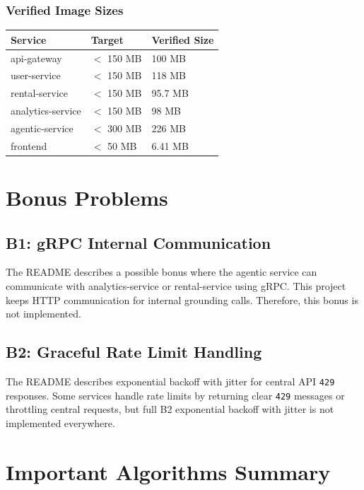 \documentclass[11pt,a4paper]{article}
\begin{document}
\subsubsection*{Verified Image Sizes}

\begin{center}
\begin{tabular}{|p{5cm}|p{3cm}|p{3cm}|}
\hline
\textbf{Service} & \textbf{Target} & \textbf{Verified Size} \\
\hline
api-gateway & $<$ 150 MB & 100 MB \\
\hline
user-service & $<$ 150 MB & 118 MB \\
\hline
rental-service & $<$ 150 MB & 95.7 MB \\
\hline
analytics-service & $<$ 150 MB & 98 MB \\
\hline
agentic-service & $<$ 300 MB & 226 MB \\
\hline
frontend & $<$ 50 MB & 6.41 MB \\
\hline
\end{tabular}
\end{center}

\section{Bonus Problems}

\subsection{B1: gRPC Internal Communication}

The README describes a possible bonus where the agentic service can communicate with analytics-service or rental-service using gRPC. This project keeps HTTP communication for internal grounding calls. Therefore, this bonus is not implemented.

\subsection{B2: Graceful Rate Limit Handling}

The README describes exponential backoff with jitter for central API \texttt{429} responses. Some services handle rate limits by returning clear \texttt{429} messages or throttling central requests, but full B2 exponential backoff with jitter is not implemented everywhere.

\section{Important Algorithms Summary}
\end{document}
